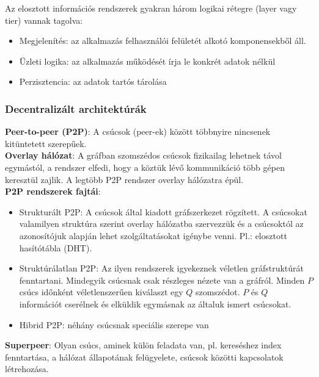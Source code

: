 \documentclass[12pt]{article}
\begin{document}
	Az elosztott információs rendszerek gyakran három logikai rétegre (layer vagy tier) vannak tagolva:
	
	\begin{itemize}
		\item	Megjelenítés: az alkalmazás felhasználói felületét alkotó komponensekből áll.
		\item	Üzleti logika: az alkalmazás működését írja le konkrét adatok nélkül
		\item	Perzisztencia: az adatok tartós tárolása
	\end{itemize}
	
	\subsubsection{Decentralizált architektúrák}
	
	\noindent \textbf{Peer-to-peer (P2P)}: A csúcsok (peer-ek) között többnyire nincsenek kitüntetett szerepűek.\\
	
	\noindent \textbf{Overlay hálózat}: A gráfban szomszédos csúcsok fizikailag lehetnek távol egymástól,
	a rendszer elfedi, hogy a köztük lévő kommunikáció több gépen keresztül zajlik. A legtöbb P2P
	rendszer overlay hálózatra épül.\\
	
	\noindent \textbf{P2P rendszerek fajtái}:
	\begin{itemize}
		\item	Strukturált P2P: A csúcsok által kiadott gráfszerkezet rögzített. A csúcsokat valamilyen struktúra
		szerint overlay hálózatba szervezzük és a csúcsoktól az azonosítójuk alapján lehet szolgáltatásokat
		igénybe venni. Pl.: elosztott hasítótábla (DHT).
		
		\item	Struktúrálatlan P2P:  Az ilyen rendszerek igyekeznek véletlen gráfstruktúrát fenntartani. Mindegyik
		csúcsnak csak részleges nézete van a gráfról. Minden $P$ csúcs időnként véletlenszerűen kiválaszt egy $Q$
		szomszédot. $P$ és $Q$ információt cserélnek és elküldik egymásnak az általuk ismert csúcsokat.
		
		\item	Hibrid P2P: néhány csúcsnak speciális szerepe van
	\end{itemize}
	
	\noindent \textbf{Superpeer}: Olyan csúcs, aminek külön feladata van, pl. kereséshez index fenntartása, a hálózat
	állapotának felügyelete, csúcsok közötti kapcsolatok létrehozása.
	
\end{document}
